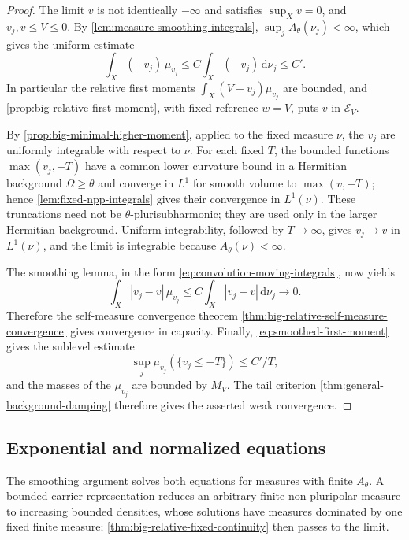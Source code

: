 \begin{proof}
The limit $v$ is not identically $-\infty$ and satisfies $\sup_Xv=0$, and $v_j,v\leq V\leq0$. By \cref{lem:measure-smoothing-integrals}, $\sup_jA_\theta(\nu_j)<\infty$, which gives the uniform estimate
\begin{equation}\label{eq:smoothed-first-moment}
 \int_X(-v_j)\,\mu_{v_j}
 \leq C\int_X(-v_j)\,\mathrm{d}\nu_j\leq C'.
\end{equation}
In particular the relative first moments $\int_X(V-v_j)\mu_{v_j}$ are bounded, and \cref{prop:big-relative-first-moment}, with fixed reference $w=V$, puts $v$ in $\mathcal E_V$.

By \cref{prop:big-minimal-higher-moment}, applied to the fixed measure $\nu$, the $v_j$ are uniformly integrable with respect to $\nu$. For each fixed $T$, the bounded functions $\max(v_j,-T)$ have a common lower curvature bound in a Hermitian background $\Omega\geq\theta$ and converge in $L^1$ for smooth volume to $\max(v,-T)$; hence \cref{lem:fixed-npp-integrals} gives their convergence in $L^1(\nu)$. These truncations need not be $\theta$-plurisubharmonic; they are used only in the larger Hermitian background. Uniform integrability, followed by $T\to\infty$, gives $v_j\to v$ in $L^1(\nu)$, and the limit is integrable because $A_\theta(\nu)<\infty$.

The smoothing lemma, in the form \eqref{eq:convolution-moving-integrals}, now yields
\[
 \int_X|v_j-v|\,\mu_{v_j}
 \leq C\int_X|v_j-v|\,\mathrm{d}\nu_j\longrightarrow0.
\]
Therefore the self-measure convergence theorem \cref{thm:big-relative-self-measure-convergence} gives convergence in capacity. Finally, \eqref{eq:smoothed-first-moment} gives the sublevel estimate
\[
 \sup_j\mu_{v_j}(\{v_j\leq-T\})\leq C'/T,
\]
and the masses of the $\mu_{v_j}$ are bounded by $M_V$. The tail criterion \cref{thm:general-background-damping} therefore gives the asserted weak convergence.
\end{proof}

\subsection{Exponential and normalized equations}
\label{sec:big-minimal-general-measures}

The smoothing argument solves both equations for measures with finite $A_\theta$. A bounded carrier representation reduces an arbitrary finite non-pluripolar measure to increasing bounded densities, whose solutions have measures dominated by one fixed finite measure; \cref{thm:big-relative-fixed-continuity} then passes to the limit.

